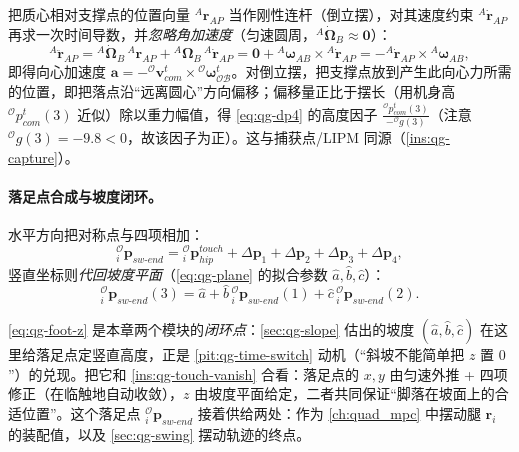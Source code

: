 \begin{derivation}\label{deriv:qg-centripetal}
把质心相对支撑点的位置向量 ${}^A\boldsymbol{r}_{AP}$ 当作刚性连杆（倒立摆），对其速度约束 ${}^A\dot{\boldsymbol{r}}_{AP}$ 再求一次时间导数，并\emph{忽略角加速度}（匀速圆周，${}^A\dot{\boldsymbol{\Omega}}_B\approx\mathbf{0}$）\cite{yu2021quadruped}：
\begin{equation}
  {}^A\ddot{\boldsymbol{r}}_{AP}
  ={}^A\dot{\boldsymbol{\Omega}}_B\,{}^A\boldsymbol{r}_{AP}+{}^A\boldsymbol{\Omega}_B\,{}^A\dot{\boldsymbol{r}}_{AP}
  =\mathbf{0}+{}^A\boldsymbol{\omega}_{AB}\times{}^A\dot{\boldsymbol{r}}_{AP}
  =-{}^A\dot{\boldsymbol{r}}_{AP}\times{}^A\boldsymbol{\omega}_{AB},
  \label{eq:qg-centripetal-deriv}
\end{equation}
即得向心加速度 $\boldsymbol{a}=-{}^{\mathcal{O}}\boldsymbol{v}_{com}^{t}\times{}^{\mathcal{O}}\boldsymbol{\omega}_{\mathcal{OB}}^{t}$。对倒立摆，把支撑点放到产生此向心力所需的位置，即把落点沿“远离圆心”方向偏移；偏移量正比于摆长（用机身高 ${}^{\mathcal{O}}p_{com}^{t}(3)$ 近似）除以重力幅值，得 \cref{eq:qg-dp4} 的高度因子 $\tfrac{{}^{\mathcal{O}}p_{com}^{t}(3)}{-{}^{\mathcal{O}}g(3)}$（注意 ${}^{\mathcal{O}}g(3)=-9.8<0$，故该因子为正）。这与捕获点/LIPM 同源（\cref{ins:qg-capture}）。
\end{derivation}

\paragraph{落足点合成与坡度闭环。}
水平方向把对称点与四项相加\cite{yu2021quadruped}：
\begin{equation}
  {}_i^{\mathcal{O}}\boldsymbol{p}_{sw\text{-}end}={}_i^{\mathcal{O}}\boldsymbol{p}_{hip}^{touch}+\Delta\boldsymbol{p}_1+\Delta\boldsymbol{p}_2+\Delta\boldsymbol{p}_3+\Delta\boldsymbol{p}_4,
  \label{eq:qg-foot-xy}
\end{equation}
竖直坐标则\emph{代回坡度平面}（\cref{eq:qg-plane} 的拟合参数 $\hat a,\hat b,\hat c$）\cite{yu2021quadruped}：
\begin{equation}
  {}_i^{\mathcal{O}}\boldsymbol{p}_{sw\text{-}end}(3)=\hat a+\hat b\,{}_i^{\mathcal{O}}\boldsymbol{p}_{sw\text{-}end}(1)+\hat c\,{}_i^{\mathcal{O}}\boldsymbol{p}_{sw\text{-}end}(2).
  \label{eq:qg-foot-z}
\end{equation}

\begin{insight}[坡度估计与落足点在此闭环]\label{ins:qg-slope-loop}
\cref{eq:qg-foot-z} 是本章两个模块的\emph{闭环点}：\cref{sec:qg-slope} 估出的坡度 $(\hat a,\hat b,\hat c)$ 在这里给落足点定竖直高度，正是 \cref{pit:qg-time-switch} 动机（“斜坡不能简单把 $z$ 置 $0$”）的兑现。把它和 \cref{ins:qg-touch-vanish} 合看：落足点的 $x,y$ 由匀速外推 + 四项修正（在临触地自动收敛），$z$ 由坡度平面给定，二者共同保证“脚落在坡面上的合适位置”。这个落足点 ${}_i^{\mathcal{O}}\boldsymbol{p}_{sw\text{-}end}$ 接着供给两处：作为 \cref{ch:quad_mpc} 中摆动腿 $\boldsymbol{r}_i$ 的装配值，以及 \cref{sec:qg-swing} 摆动轨迹的终点。
\end{insight}


